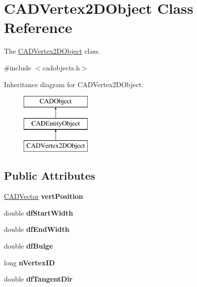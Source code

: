 \hypertarget{class_c_a_d_vertex2_d_object}{}\section{C\+A\+D\+Vertex2\+D\+Object Class Reference}
\label{class_c_a_d_vertex2_d_object}


The \hyperlink{class_c_a_d_vertex2_d_object}{C\+A\+D\+Vertex2\+D\+Object} class.  




{\ttfamily \#include $<$cadobjects.\+h$>$}

Inheritance diagram for C\+A\+D\+Vertex2\+D\+Object\+:\begin{figure}[H]
\begin{center}
\leavevmode
\includegraphics[height=3.000000cm]{class_c_a_d_vertex2_d_object}
\end{center}
\end{figure}
\subsection*{Public Attributes}
\begin{DoxyCompactItemize}
\item 
\hyperlink{class_c_a_d_vector}{C\+A\+D\+Vector} {\bfseries vert\+Position}\hypertarget{class_c_a_d_vertex2_d_object_a6a10e46be603b57e91bc6a03570b3673}{}\label{class_c_a_d_vertex2_d_object_a6a10e46be603b57e91bc6a03570b3673}

\item 
double {\bfseries df\+Start\+Width}\hypertarget{class_c_a_d_vertex2_d_object_a54490515424058d05d614f52fd8120f8}{}\label{class_c_a_d_vertex2_d_object_a54490515424058d05d614f52fd8120f8}

\item 
double {\bfseries df\+End\+Width}\hypertarget{class_c_a_d_vertex2_d_object_af26e0b53bdd98e68d66188bab02bf5a6}{}\label{class_c_a_d_vertex2_d_object_af26e0b53bdd98e68d66188bab02bf5a6}

\item 
double {\bfseries df\+Bulge}\hypertarget{class_c_a_d_vertex2_d_object_a27738b60f8dd9ff049b12c235ad3dd4d}{}\label{class_c_a_d_vertex2_d_object_a27738b60f8dd9ff049b12c235ad3dd4d}

\item 
long {\bfseries n\+Vertex\+ID}\hypertarget{class_c_a_d_vertex2_d_object_a2ecc926827fb740b818409f4cce6be63}{}\label{class_c_a_d_vertex2_d_object_a2ecc926827fb740b818409f4cce6be63}

\item 
double {\bfseries df\+Tangent\+Dir}\hypertarget{class_c_a_d_vertex2_d_object_ab5abbc48ce18dabda362a5c709ae83c4}{}\label{class_c_a_d_vertex2_d_object_ab5abbc48ce18dabda362a5c709ae83c4}

\end{DoxyCompactItemize}
